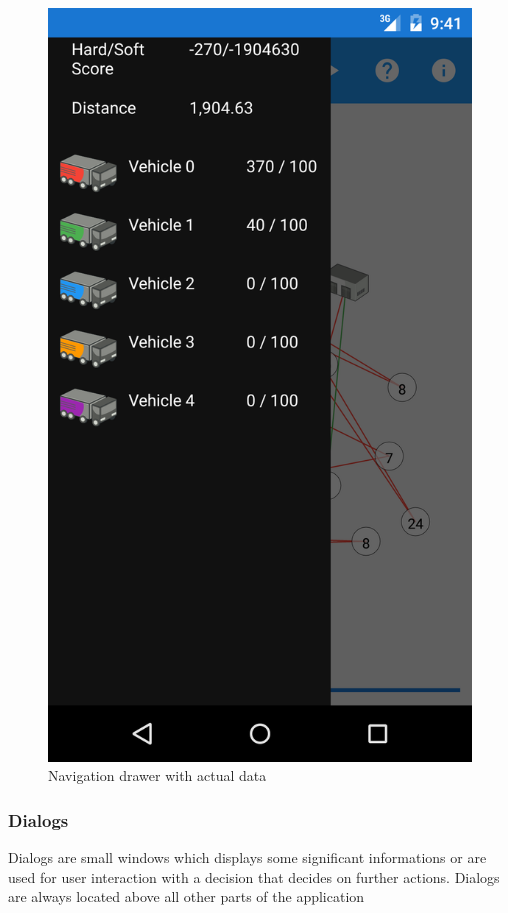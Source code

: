 \begin{figure}[h!]
    \centering
    \includegraphics[scale=0.15]{fig/nav_drawer.png}
    \caption{Navigation drawer with actual data}
    \label{navigationDrawer}
\end{figure}

\subsubsection{Dialogs}
Dialogs are small windows which displays some significant informations or are used for user interaction with a decision
that decides on further actions. Dialogs are always located above all other parts of the application

